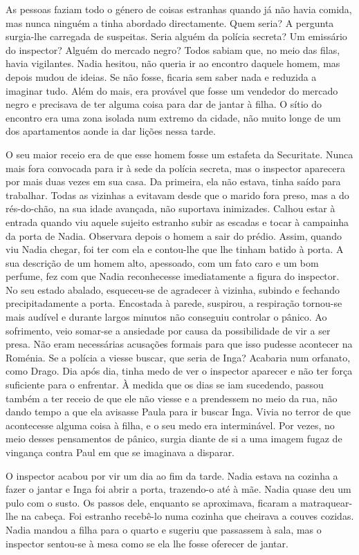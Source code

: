 As pessoas faziam todo o género de coisas estranhas quando já não havia
comida, mas nunca ninguém a tinha abordado directamente. Quem seria? A
pergunta surgia-lhe carregada de suspeitas. Seria alguém da polícia secreta? Um
emissário do inspector? Alguém do mercado
negro? Todos sabiam que, no meio das filas, havia vigilantes. Nadia
hesitou, não queria ir ao encontro daquele homem, mas depois mudou de
ideias. Se não fosse, ficaria sem saber nada e reduzida a imaginar tudo.
Além do mais, era provável que fosse um vendedor do mercado negro e
precisava de ter alguma coisa para dar de jantar à filha. O sítio do
encontro era uma zona isolada num extremo da cidade, não muito longe de
um dos apartamentos aonde ia dar lições nessa tarde.

O seu maior receio era de que esse homem fosse um estafeta da
Securitate. Nunca mais fora convocada para ir à sede da polícia secreta,
mas o inspector aparecera por mais duas vezes em sua casa. Da primeira,
ela não estava, tinha saído para trabalhar. Todas as vizinhas a evitavam
desde que o marido fora preso, mas a do rés-do-chão, na sua idade
avançada, não suportava inimizades. Calhou estar à entrada quando viu
aquele sujeito estranho subir as escadas e tocar à campainha da porta de
Nadia. Observara depois o homem a sair do prédio. Assim, quando viu
Nadia chegar, foi ter com ela e contou-lhe que lhe tinham batido à
porta. A sua descrição de um homem alto, apessoado, com um fato caro e
um bom perfume, fez com que Nadia reconhecesse imediatamente a figura do
inspector. No seu estado abalado, esqueceu-se de agradecer à vizinha,
subindo e fechando precipitadamente a porta. Encostada à parede,
suspirou, a respiração tornou-se mais audível e durante largos minutos
não conseguiu controlar o pânico. Ao sofrimento, veio somar-se a
ansiedade por causa da possibilidade de vir a ser presa. Não eram
necessárias acusações formais para que isso pudesse acontecer na
Roménia. Se a polícia a viesse buscar, que seria de Inga? Acabaria num
orfanato, como Drago. Dia após dia, tinha medo de ver o inspector
aparecer e não ter força suficiente para o enfrentar. À medida que os
dias se iam sucedendo, passou também a ter receio de que ele não viesse
e a prendessem no meio da rua, não dando tempo a que ela avisasse
Paula para ir buscar Inga. Vivia no terror de que acontecesse alguma
coisa à filha, e o seu medo era interminável. Por vezes, no meio
desses pensamentos de pânico, surgia diante de si a uma imagem fugaz de
vingança contra Paul em que se imaginava a disparar.

O inspector acabou por vir um dia ao fim da tarde. Nadia estava na
cozinha a fazer o jantar e Inga foi abrir a porta, trazendo-o até à mãe.
Nadia quase deu um pulo com o susto. Os passos dele, enquanto se
aproximava, ficaram a matraquear-lhe na cabeça. Foi estranho recebê-lo numa cozinha que cheirava a couves cozidas. Nadia mandou a filha
para o quarto e sugeriu que passassem à sala, mas o inspector sentou-se
à mesa como se ela lhe fosse oferecer de jantar.

